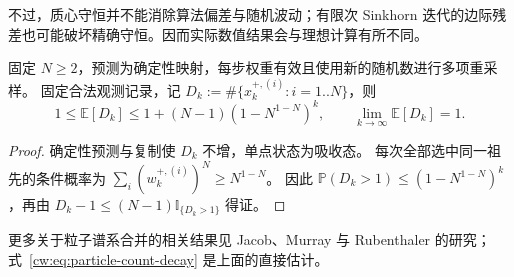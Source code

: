 不过，质心守恒并不能消除算法偏差与随机波动；有限次 Sinkhorn 迭代的边际残差也可能破坏精确守恒。因而实际数值结果会与理想计算有所不同。

\begin{theorem}[零过程噪声下的粒子贫化]\label{cw:thm:bpf-impoverishment}
固定 $N\ge2$，预测为确定性映射，每步权重有效且使用新的随机数进行多项重采样。
固定合法观测记录，记 $D_k:=\#\{x_k^{+,(i)}:i=1..N\}$，则
\begin{equation}\label{cw:eq:particle-count-decay}
1\le\mathbb E[D_k]\le1+(N-1)(1-N^{1-N})^k,\qquad
\lim_{k\to\infty}\mathbb E[D_k]=1.
\end{equation}
\end{theorem}
\begin{proof}
确定性预测与复制使 $D_k$ 不增，单点状态为吸收态。
每次全部选中同一祖先的条件概率为 $\sum_i(w_k^{+,(i)})^N\ge N^{1-N}$。
因此 $\mathbb P(D_k>1)\le(1-N^{1-N})^k$，再由 $D_k-1\le(N-1)\mathbb I_{\{D_k>1\}}$ 得证。
\end{proof}
更多关于粒子谱系合并的相关结果见
Jacob、Murray 与 Rubenthaler 的研究\cite{jacob2015path}；式~\eqref{cw:eq:particle-count-decay} 是上面的直接估计。

